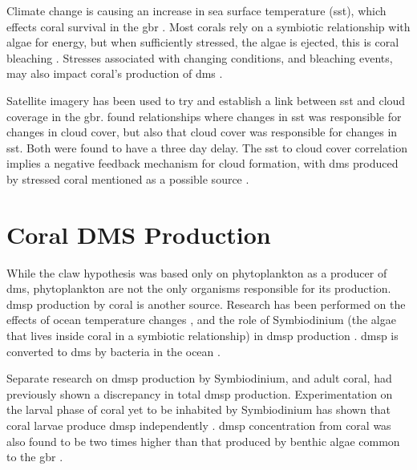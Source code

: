 	Climate change is causing an increase in sea surface temperature (\gls{sst}), which effects coral survival in the \gls{gbr} \citep{hoeghguldberg:1999bi}. Most corals rely on a symbiotic relationship with algae for energy, but when sufficiently stressed, the algae is ejected, this is coral bleaching \citep{hoeghguldberg:1999bi}. Stresses associated with changing conditions, and bleaching events, may also impact coral's production of \gls{dms} \citep{raina:2013fj}.

	Satellite imagery has been used to try and establish a link between \gls{sst} and cloud coverage in the \gls{gbr}. \citet{leahy:2013en} found relationships where changes in \gls{sst} was responsible for changes in cloud cover, but also that cloud cover was responsible for changes in \gls{sst}. Both were found to have a three day delay. The \gls{sst} to cloud cover correlation implies a negative feedback mechanism for cloud formation, with \gls{dms} produced by stressed coral mentioned as a possible source \citep{leahy:2013en}.


	\section{Coral DMS Production}
	\label{subsec:coraldms}

	While the \gls{claw} hypothesis was based only on phytoplankton as a producer of \gls{dms}, phytoplankton are not the only organisms responsible for its production. \gls{dmsp} production by coral is another source. Research has been performed on the effects of ocean temperature changes \citep{jones2007factors}, and the role of Symbiodinium (the algae that lives inside coral in a symbiotic relationship) in \gls{dmsp} production \citep{raina:2013fj}. \gls{dmsp} is converted to \gls{dms} by bacteria in the ocean \citep{todd2007structural}.

	Separate research on \gls{dmsp} production by Symbiodinium, and adult coral, had previously shown a discrepancy in total \gls{dmsp} production. Experimentation on the larval phase of coral yet to be inhabited by Symbiodinium has shown that coral larvae produce \gls{dmsp} independently \citep{raina:2013fj}. \gls{dmsp} concentration from coral was also found to be two times higher than that produced by benthic algae common to the \gls{gbr} \citep{raina:2013fj}. 

